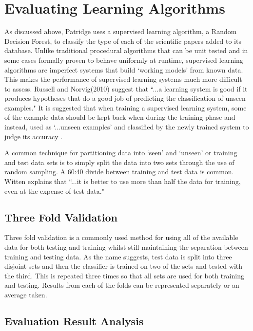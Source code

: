 \section{ Evaluating Learning Algorithms }
\label{sec:evaluation_learners}

As discussed above, Patridge uses a supervised learning algorithm, a Random
Decision Forest, to classify the type of each of the scientific papers added to
its database. Unlike traditional procedural algorithms that can be unit tested
and in some cases formally proven to behave uniformly at
runtime\cite{filliatre2007formal}, supervised learning algorithms are imperfect
systems that build `working models' from known data. This makes the performance
of supervised learning systems much more difficult to assess. Russell and
Norvig(2010) suggest that ``...a learning system is good if it produces hypotheses
that do a good job of predicting the classification of unseen
examples\cite{russell2010artificial}." It is suggested that when training a
supervised learning system, some of the example data should be kept back when
during the training phase and instead, used as `...unseen examples' and classified
by the newly trained system to judge its accuracy
\cite{alpaydin2004introduction}\cite{russell2010artificial}.

A common technique for partitioning data into `seen' and `unseen' or training
and test data sets is to simply split the data into two sets through the use of
random sampling.  A 60:40 divide between training and test data is common.
Witten explains that ``...it is better to use more than half the data for
training, even at the expense of test data\cite{witten2005data}." 

\subsection{ Three Fold Validation }

Three fold validation is a commonly used method for using all of the available
data for both testing and training whilst still maintaining the separation
between training and testing data. As the name suggests, test data is split
into three disjoint sets and then the classifier is trained on two of the sets
and tested with the third. This is repeated three times so that all sets are
used for both training and testing. Results from each of the folds can be
represented separately or an average taken.

\subsection{ Evaluation Result Analysis } 

